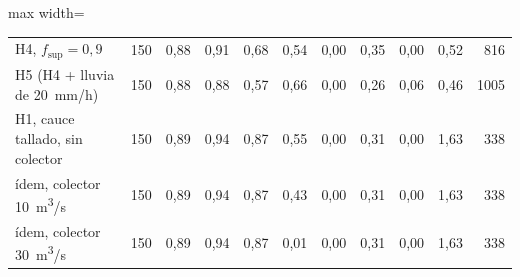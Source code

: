 \begin{table}[htbp]
{\begin{adjustbox}{max width=\textwidth}
\begin{tabular}{llrrrrrrrrr}
H4, $f_\mathrm{sup}=0{,}9$ & 150 & 0,88 & 0,91 & 0,68 & 0,54 & 0,00 & 0,35 & 0,00 & 0,52 & 816\\
H5 (H4 + lluvia de \SI{20}{mm/h}) & 150 & 0,88 & 0,88 & 0,57 & 0,66 & 0,00 & 0,26 & 0,06 & 0,46 & 1005\\
H1, cauce tallado, sin colector & 150 & 0,89 & 0,94 & 0,87 & 0,55 & 0,00 & 0,31 & 0,00 & 1,63 & 338\\
\quad ídem, colector \SI{10}{m^3/s} & 150 & 0,89 & 0,94 & 0,87 & 0,43 & 0,00 & 0,31 & 0,00 & 1,63 & 338\\
\quad ídem, colector \SI{30}{m^3/s} & 150 & 0,89 & 0,94 & 0,87 & 0,01 & 0,00 & 0,31 & 0,00 & 1,63 & 338\\
\bottomrule\end{tabular}\end{adjustbox}}
\end{table}

